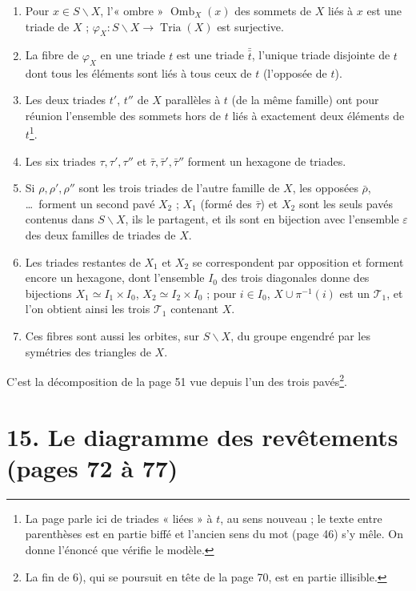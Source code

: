 \documentclass[11pt,a4paper]{article}
\begin{document}
\begin{enumerate}
\item[1)] Pour $x \in S \smallsetminus X$, l'« ombre » $\operatorname{Omb}_X(x)$
  des sommets de $X$ liés à $x$ est une triade de $X$ ; $\varphi_X : S
  \smallsetminus X \to \operatorname{Tria}(X)$ est surjective.
\item[2)] La fibre de $\varphi_X$ en une triade $t$ est une triade $\bar{\bar
  t}$, l'unique triade disjointe de $t$ dont tous les éléments sont liés à tous
  ceux de $t$ (l'opposée de $t$).
\item[3)] Les deux triades $t'$, $t''$ de $X$ parallèles à $t$ (de la même
  famille) ont pour réunion l'ensemble des sommets hors de $t$ liés à exactement
  deux éléments de $t$\footnote{La page parle ici de triades « liées » à $t$, au
  sens nouveau ; le texte entre parenthèses est en partie biffé et l'ancien sens
  du mot (page 46) s'y mêle. On donne l'énoncé que vérifie le modèle.}.
\item[4)] Les six triades $\tau, \tau', \tau''$ et $\bar\tau, \bar\tau',
  \bar\tau''$ forment un hexagone de triades.
\item[5)] Si $\rho, \rho', \rho''$ sont les trois triades de l'autre famille de
  $X$, les opposées $\bar\rho$, \ldots\ forment un second pavé $X_2$ ; $X_1$
  (formé des $\bar\tau$) et $X_2$ sont les seuls pavés contenus dans $S
  \smallsetminus X$, ils le partagent, et ils sont en bijection avec l'ensemble
  $\varepsilon$ des deux familles de triades de $X$.
\item[6)--7)] Les triades restantes de $X_1$ et $X_2$ se correspondent par
  opposition et forment encore un hexagone, dont l'ensemble $I_0$ des trois
  diagonales donne des bijections $X_1 \simeq I_1 \times I_0$, $X_2 \simeq I_2
  \times I_0$ ; pour $i \in I_0$, $X \cup \pi^{-1}(i)$ est un $\mathcal{T}_1$,
  et l'on obtient ainsi les trois $\mathcal{T}_1$ contenant $X$.
\item[8)] Ces fibres sont aussi les orbites, sur $S \smallsetminus X$, du
  groupe engendré par les symétries des triangles de $X$.
\end{enumerate}

C'est la décomposition de la page 51 vue depuis l'un des trois pavés\footnote{La
fin de 6), qui se poursuit en tête de la page 70, est en partie illisible.}.

\section*{15. Le diagramme des revêtements (pages 72 à 77)}
\end{document}
